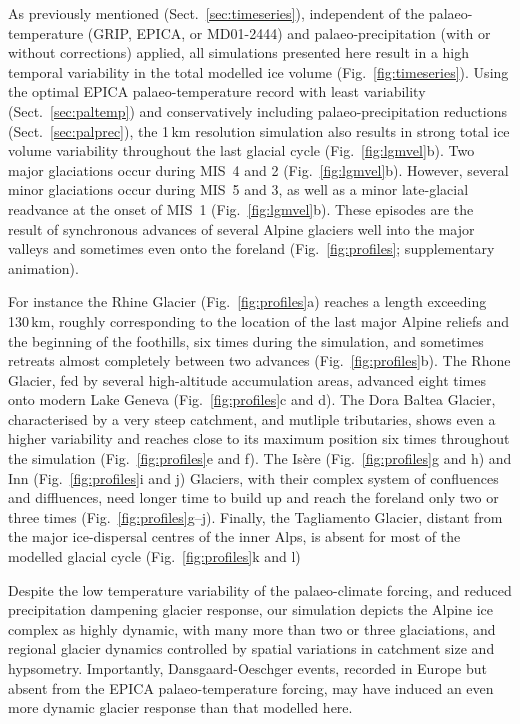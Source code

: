 \documentclass[tc, manuscript]{copernicus}
\begin{document}
    As previously mentioned (Sect.~\ref{sec:timeseries}), independent of the
    palaeo-temperature (GRIP, EPICA, or MD01-2444) and palaeo-precipitation
    (with or without corrections) applied, all simulations presented here
    result in a high temporal variability in the total modelled ice volume
    (Fig.~\ref{fig:timeseries}). Using the optimal EPICA palaeo-temperature
    record with least variability (Sect.~\ref{sec:paltemp}) and conservatively
    including palaeo-precipitation reductions (Sect.~\ref{sec:palprec}), the
    1\,km resolution simulation also results in strong total ice volume
    variability throughout the last glacial cycle (Fig.~\ref{fig:lgmvel}b).
    Two major glaciations occur during MIS~4 and 2 (Fig.~\ref{fig:lgmvel}b).
    However, several minor glaciations occur during MIS~5 and 3, as well as a
    minor late-glacial readvance at the onset of MIS~1
    (Fig.~\ref{fig:lgmvel}b). These episodes are the result of synchronous
    advances of several Alpine glaciers well into the major valleys and sometimes
    even onto the foreland (Fig.~\ref{fig:profiles}; supplementary animation).

    For instance the Rhine Glacier (Fig.~\ref{fig:profiles}a) reaches a length
    exceeding 130\,km, roughly corresponding to the location of the last major
    Alpine reliefs and the beginning of the foothills, six times during the
    simulation, and sometimes retreats almost completely between two advances
    (Fig.~\ref{fig:profiles}b). The Rhone Glacier, fed by several high-altitude
    accumulation areas, advanced eight times onto modern Lake Geneva
    (Fig.~\ref{fig:profiles}c and d). The Dora Baltea Glacier, characterised
    by a very steep catchment, and mutliple tributaries, shows even a higher
    variability and reaches close to its maximum position six times throughout
    the simulation (Fig.~\ref{fig:profiles}e and f). The Isère
    (Fig.~\ref{fig:profiles}g and h) and Inn (Fig.~\ref{fig:profiles}i and j)
    Glaciers, with their complex system of confluences and diffluences, need
    longer time to build up and reach the foreland only two or three times
    (Fig.~\ref{fig:profiles}g--j). Finally, the Tagliamento Glacier, distant
    from the major ice-dispersal centres of the inner Alps, is absent for most
    of the modelled glacial cycle (Fig.~\ref{fig:profiles}k and l)

    Despite the low temperature variability of the palaeo-climate forcing, and
    reduced precipitation dampening glacier response, our simulation depicts
    the Alpine ice complex as highly dynamic, with many more than two or three
    \citep[cf.][]{Preusser.2004,Ivy-Ochs.etal.2008} glaciations, and regional
    glacier dynamics controlled by spatial variations in catchment size and
    hypsometry. Importantly, Dansgaard-Oeschger events, recorded in
    Europe \citep{Spotl.Mangini.2002, Wohlfarth.etal.2008,
    Luetscher.etal.2015} but absent from the EPICA palaeo-temperature forcing,
    may have induced an even more dynamic glacier response than that modelled
    here.
\end{document}
